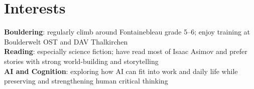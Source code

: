 \documentclass[letterpaper,11pt]{article}
\begin{document}
\section{Interests}
 \begin{itemize}[leftmargin=0.15in, label={}]
    \small{\item{
  \textbf{Bouldering}{: regularly climb around Fontainebleau grade 5--6; enjoy training at Boulderwelt OST and DAV Thalkirchen} \\
  \textbf{Reading}{: especially science fiction; have read most of Isaac Asimov and prefer stories with strong world-building and storytelling} \\
  \textbf{AI and Cognition}{: exploring how AI can fit into work and daily life while preserving and strengthening human critical thinking}
    }}
 \end{itemize}
\end{document}
